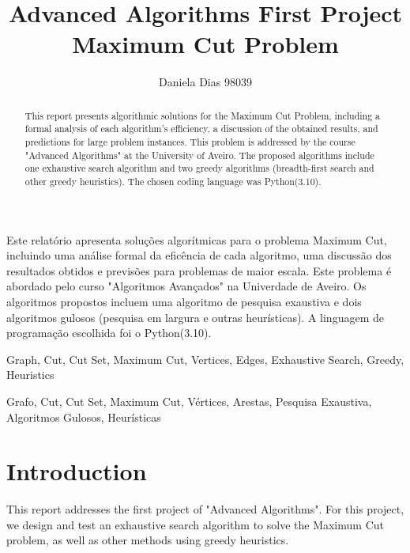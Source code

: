 \documentclass[]{revdetua}
\begin{document}

\title{Advanced Algorithms First Project \linebreak Maximum Cut Problem}
\author{Daniela Dias 98039}
\maketitle

\begin{abstract}
This report presents algorithmic solutions for the Maximum Cut Problem, including a formal analysis of each algorithm's efficiency, a discussion of the obtained results, and predictions for large problem instances. This problem is addressed by the course "Advanced Algorithms" at the University of Aveiro. The proposed algorithms include one exhaustive search algorithm and two greedy algorithms (breadth-first search and other greedy heuristics). The chosen coding language was Python(3.10).
\end{abstract}

\begin{resumo}%
Este relatório apresenta soluções algorítmicas para o problema Maximum Cut, incluindo uma análise formal da eficência de cada algoritmo, uma discussão dos resultados obtidos e previsões para problemas de maior escala. Este problema é abordado pelo curso "Algoritmos Avançados" na Univerdade de Aveiro. Os algoritmos propostos incluem uma algoritmo de pesquisa exaustiva e dois algoritmos gulosos (pesquisa em largura e outras heurísticas). A linguagem de programação escolhida foi o Python(3.10).
\end{resumo}

\begin{keywords}%
Graph, Cut, Cut Set, Maximum Cut, Vertices, Edges, Exhaustive Search, Greedy, Heuristics
\end{keywords}

\begin{palavraschave}%
Grafo, Cut, Cut Set, Maximum Cut, Vértices, Arestas, Pesquisa Exaustiva, Algoritmos Gulosos, Heurísticas
\end{palavraschave}

\section{Introduction}
This report addresses the first project of "Advanced Algorithms". For this project, we design and test an exhaustive search algorithm to solve the Maximum Cut problem, as well as other methods using greedy heuristics.
\end{document}
